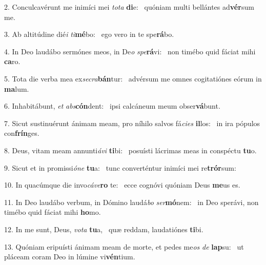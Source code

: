 2. Conculcavérunt me inimíci mei \textit{to}\textit{ta} \textbf{di}e: \ast\  quóniam multi bellántes ad\textbf{vér}sum me.\

3. Ab altitúdine dié\textit{i} \textit{ti}\textbf{mé}bo: \ast\  ego vero in te spe\textbf{rá}bo.\

4. In Deo laudábo sermónes meos, in De\textit{o} \textit{spe}\textbf{rá}vi: \ast\  non timébo quid fáciat mihi \textbf{ca}ro.\

5. Tota die verba mea ex\textit{se}\textit{cra}\textbf{bán}tur: \ast\  advérsum me omnes cogitatiónes eórum in \textbf{ma}lum.\

6. Inhabitábunt, \textit{et} \textit{abs}\textbf{cón}dent: \ast\  ipsi calcáneum meum obser\textbf{vá}bunt.\

7. Sicut sustinuérunt ánimam meam, pro níhilo salvos fá\textit{ci}\textit{es} \textbf{il}los: \ast\  in ira pópulos con\textbf{frín}ges.\

8. Deus, vitam meam annunti\textit{á}\textit{vi} \textbf{ti}bi: \ast\  posuísti lácrimas meas in conspéctu \textbf{tu}o.\

9. Sicut et in promissi\textit{ó}\textit{ne} \textbf{tu}a: \ast\  tunc converténtur inimíci mei re\textbf{trór}sum:\

10. In quacúmque die invo\textit{cá}\textit{ve}\textbf{ro} te: \ast\  ecce cognóvi quóniam Deus \textbf{me}us es.\

11. In Deo laudábo verbum, in Dómino laudá\textit{bo} \textit{ser}\textbf{mó}nem: \ast\  in Deo sperávi, non timébo quid fáciat mihi \textbf{ho}mo.\

12. In me sunt, Deus, \textit{vo}\textit{ta} \textbf{tu}a, \ast\  quæ reddam, laudatiónes \textbf{ti}bi.\

13. Quóniam eripuísti ánimam meam de morte, et pedes me\textit{os} \textit{de} \textbf{lap}su: \ast\  ut pláceam coram Deo in lúmine vi\textbf{vén}tium.\

